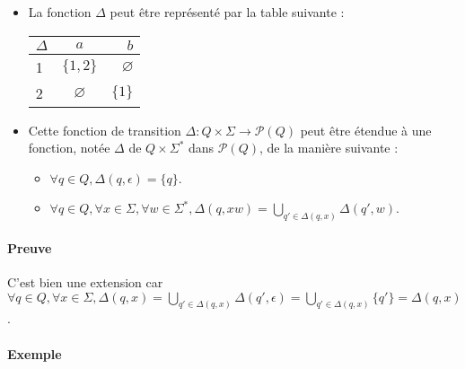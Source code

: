 \begin{itemize}
	\item La fonction $\Delta$ peut être représenté par la table suivante :\\

	\begin{center}
		\begin{tabular}{|l|c|r|}
			\hline
			$\Delta$ & $a$ & $b$\\

			\hline
			1 & $\{1,2\}$ & $\varnothing$\\

			\hline
			2 & $\varnothing$ & $\{1\}$\\

			\hline
		\end{tabular}
	\end{center}
	
	\item Cette fonction de transition $\Delta : Q \times \Sigma \rightarrow \mathcal{P}(Q)$ peut être étendue à une fonction, notée $\Delta$ de $Q \times \Sigma^*$ dans $\mathcal{P}(Q)$, de la manière suivante :

	\begin{itemize}
		\item $\forall q \in Q, \Delta(q,\epsilon) = \{q\}$.
		\item $\forall q \in Q, \forall x \in \Sigma, \forall w \in \Sigma^*, \Delta(q,xw) = \bigcup\limits_{q' \in \Delta(q,x)} \Delta(q',w)$.
	\end{itemize}

\end{itemize}



\paragraph{Preuve} %
\label{par:preuve}

C'est bien une extension car \\$\forall q \in Q, \forall x \in \Sigma, \Delta(q,x) = \bigcup\limits_{q' \in \Delta(q,x)} \Delta(q',\epsilon) = \bigcup\limits_{q' \in \Delta(q,x)} \{q'\} = \Delta(q,x)$.



\paragraph{Exemple} %
\label{par:exemple}

